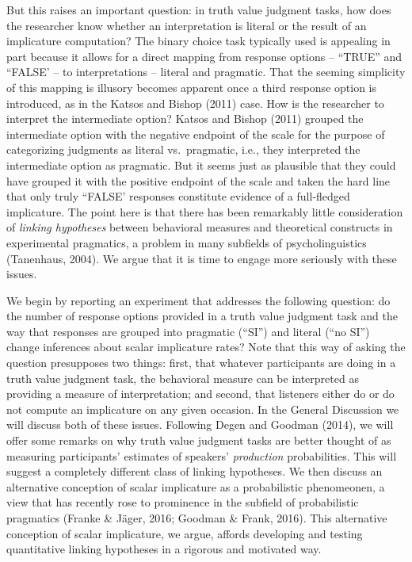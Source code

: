 \documentclass[man]{apa6}
\theoremstyle{definition}
\theoremstyle{definition}
\theoremstyle{definition}
\theoremstyle{remark}
\begin{document}
But this raises an important question: in truth value judgment tasks,
how does the researcher know whether an interpretation is literal or the
result of an implicature computation? The binary choice task typically
used is appealing in part because it allows for a direct mapping from
response options -- ``TRUE'' and ``FALSE' -- to interpretations -- literal and
pragmatic. That the seeming simplicity of this mapping is illusory
becomes apparent once a third response option is introduced, as in the
Katsos and Bishop (2011) case. How is the researcher to interpret the
intermediate option? Katsos and Bishop (2011) grouped the intermediate
option with the negative endpoint of the scale for the purpose of
categorizing judgments as literal vs.~pragmatic, i.e., they interpreted
the intermediate option as pragmatic. But it seems just as plausible
that they could have grouped it with the positive endpoint of the scale
and taken the hard line that only truly ``FALSE' responses constitute
evidence of a full-fledged implicature. The point here is that there has
been remarkably little consideration of \emph{linking hypotheses}
between behavioral measures and theoretical constructs in experimental
pragmatics, a problem in many subfields of psycholinguistics (Tanenhaus,
2004). We argue that it is time to engage more seriously with these
issues.

We begin by reporting an experiment that addresses the following
question: do the number of response options provided in a truth value
judgment task and the way that responses are grouped into pragmatic
(\enquote{SI}) and literal (\enquote{no SI}) change inferences about
scalar implicature rates? Note that this way of asking the question
presupposes two things: first, that whatever participants are doing in a
truth value judgment task, the behavioral measure can be interpreted as
providing a measure of interpretation; and second, that listeners either
do or do not compute an implicature on any given occasion. In the
General Discussion we will discuss both of these issues.
Following Degen and Goodman (2014), we will offer some remarks on why
truth value judgment tasks are better thought of as measuring
participants' estimates of speakers' \emph{production} probabilities.
This will suggest a completely different class of linking hypotheses.
We then discuss an alternative conception of scalar implicature as a
probabilistic phenomeonen, a view that has recently rose to prominence
in the subfield of probabilistic pragmatics (Franke \& Jäger, 2016;
Goodman \& Frank, 2016). This alternative conception of scalar
implicature, we argue, affords developing and testing quantitative
linking hypotheses in a rigorous and motivated way.
\end{document}
